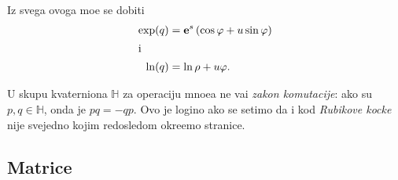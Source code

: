 Iz svega ovoga mo{\zv}e se dobiti
\begin{align}
    \exp(q) &= {\bf e}^s \left( \cos\varphi + {u}\sin\varphi \right)\\
    \intertext{i}
    \ln(q)  &= \ln\rho + {u}\varphi.
\end{align}


\bigskip

\danger U skupu kvaterniona ${\mathbb H}$ za operaciju mno{\zv}e{\nj}a ne va{\zv}i {\sl zakon komutacije}: ako su
$p,q\in{\mathbb H}$, onda je $pq=-qp$. Ovo je logi{\cv}no ako se setimo da i kod
{\sl Rubikove kocke\/} nije svejedno kojim redosledom okre{\cc}emo stranice.

\newpage

\subsection{Matrice}

\newpage
